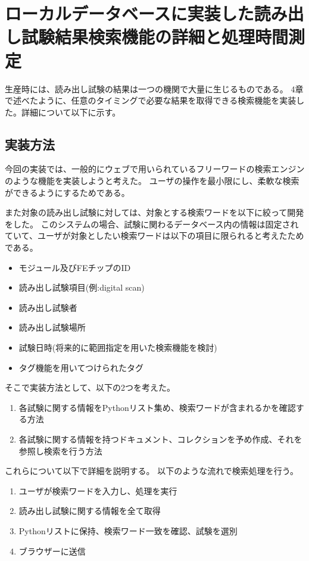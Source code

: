 \chapter{ローカルデータベースに実装した読み出し試験結果検索機能の詳細と処理時間測定}

生産時には、読み出し試験の結果は一つの機関で大量に生じるものである。
4章で述べたように、任意のタイミングで必要な結果を取得できる検索機能を実装した。詳細について以下に示す。


\section{実装方法}
今回の実装では、一般的にウェブで用いられているフリーワードの検索エンジンのような機能を実装しようと考えた。
ユーザの操作を最小限にし、柔軟な検索ができるようにするためである。

また対象の読み出し試験に対しては、対象とする検索ワードを以下に絞って開発をした。
このシステムの場合、試験に関わるデータベース内の情報は固定されていて、ユーザが対象としたい検索ワードは以下の項目に限られると考えたためである。

\begin{itemize}
  \item モジュール及びFEチップのID
  \item 読み出し試験項目(例:digital scan)
  \item 読み出し試験者
  \item 読み出し試験場所
  \item 試験日時(将来的に範囲指定を用いた検索機能を検討)
  \item タグ機能を用いてつけられたタグ
\end{itemize}

そこで実装方法として、以下の2つを考えた。
\begin{enumerate}
  \item 各試験に関する情報をPythonリスト集め、検索ワードが含まれるかを確認する方法
  \item 各試験に関する情報を持つドキュメント、コレクションを予め作成、それを参照し検索を行う方法
\end{enumerate}

これらについて以下で詳細を説明する。
以下のような流れで検索処理を行う。
\begin{enumerate}
  \item ユーザが検索ワードを入力し、処理を実行
  \item 読み出し試験に関する情報を全て取得
  \item Pythonリストに保持、検索ワード一致を確認、試験を選別
  \item ブラウザーに送信
\end{enumerate}

